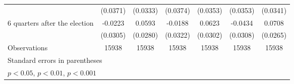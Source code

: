 \begin{table}[htbp]
\begin{tabular}{l*{6}{c}}
                    &    (0.0371)         &    (0.0333)         &    (0.0374)         &    (0.0353)         &    (0.0353)         &    (0.0341)         \\
[1em]
 6 quarters after the election&     -0.0223         &      0.0593\sym{*}  &     -0.0188         &      0.0623\sym{*}  &     -0.0434         &      0.0708\sym{**} \\
                    &    (0.0305)         &    (0.0280)         &    (0.0322)         &    (0.0302)         &    (0.0308)         &    (0.0265)         \\
\hline
Observations        &       15938         &       15938         &       15938         &       15938         &       15938         &       15938         \\
\hline\hline
\multicolumn{7}{l}{\footnotesize Standard errors in parentheses}\\
\multicolumn{7}{l}{\footnotesize \sym{*} \(p<0.05\), \sym{**} \(p<0.01\), \sym{***} \(p<0.001\)}\\
\end{tabular}
\end{table}
